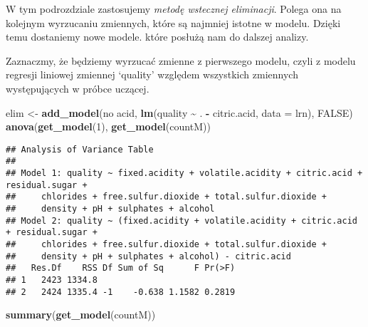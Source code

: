 \documentclass[
]{article}
\newenvironment{Shaded}{\begin{snugshade}}{\end{snugshade}}
\newcommand{\AttributeTok}[1]{\textcolor[rgb]{0.13,0.29,0.53}{#1}}
\newcommand{\ConstantTok}[1]{\textcolor[rgb]{0.56,0.35,0.01}{#1}}
\newcommand{\DecValTok}[1]{\textcolor[rgb]{0.00,0.00,0.81}{#1}}
\newcommand{\FunctionTok}[1]{\textcolor[rgb]{0.13,0.29,0.53}{\textbf{#1}}}
\newcommand{\NormalTok}[1]{#1}
\newcommand{\OtherTok}[1]{\textcolor[rgb]{0.56,0.35,0.01}{#1}}
\newcommand{\SpecialCharTok}[1]{\textcolor[rgb]{0.81,0.36,0.00}{\textbf{#1}}}
\newcommand{\StringTok}[1]{\textcolor[rgb]{0.31,0.60,0.02}{#1}}
\begin{document}
W tym podrozdziale zastosujemy \emph{metodę wstecznej eliminacji}.
Polega ona na kolejnym wyrzucaniu zmiennych, które są najmniej istotne w
modelu. Dzięki temu dostaniemy nowe modele. które posłużą nam do dalszej
analizy.

Zaznaczmy, że będziemy wyrzucać zmienne z pierwszego modelu, czyli z
modelu regresji liniowej zmiennej `quality' względem wszystkich
zmiennych występujących w próbce uczącej.

\begin{Shaded}
\begin{Highlighting}[]
\NormalTok{elim }\OtherTok{\textless{}{-}} \FunctionTok{add\_model}\NormalTok{(}\StringTok{\textquotesingle{}no acid\textquotesingle{}}\NormalTok{, }\FunctionTok{lm}\NormalTok{(quality }\SpecialCharTok{\textasciitilde{}}\NormalTok{ . }\SpecialCharTok{{-}}\NormalTok{ citric.acid, }\AttributeTok{data =}\NormalTok{ lrn), }\ConstantTok{FALSE}\NormalTok{)}
\FunctionTok{anova}\NormalTok{(}\FunctionTok{get\_model}\NormalTok{(}\DecValTok{1}\NormalTok{), }\FunctionTok{get\_model}\NormalTok{(countM))}
\end{Highlighting}
\end{Shaded}

\begin{verbatim}
## Analysis of Variance Table
## 
## Model 1: quality ~ fixed.acidity + volatile.acidity + citric.acid + residual.sugar + 
##     chlorides + free.sulfur.dioxide + total.sulfur.dioxide + 
##     density + pH + sulphates + alcohol
## Model 2: quality ~ (fixed.acidity + volatile.acidity + citric.acid + residual.sugar + 
##     chlorides + free.sulfur.dioxide + total.sulfur.dioxide + 
##     density + pH + sulphates + alcohol) - citric.acid
##   Res.Df    RSS Df Sum of Sq      F Pr(>F)
## 1   2423 1334.8                           
## 2   2424 1335.4 -1    -0.638 1.1582 0.2819
\end{verbatim}

\begin{Shaded}
\begin{Highlighting}[]
\FunctionTok{summary}\NormalTok{(}\FunctionTok{get\_model}\NormalTok{(countM))}
\end{Highlighting}
\end{Shaded}
\end{document}
